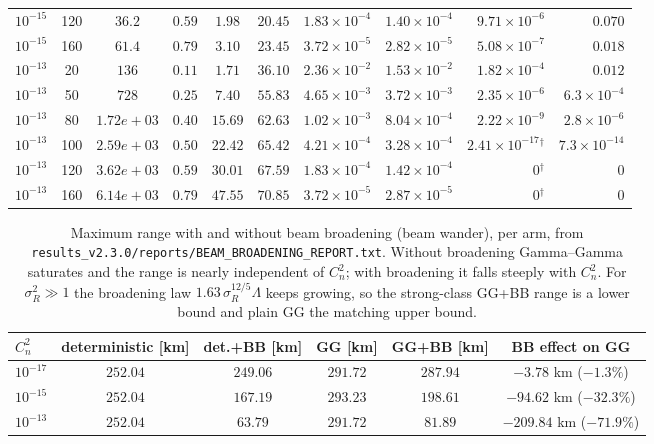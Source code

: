 \begin{table}[htbp]
\begin{tabular}{lcccccccrr}
$10^{-15}$ & 120 & $36.2$ & $0.59$ & $1.98$ & $20.45$ & $1.83\times10^{-4}$ & $1.40\times10^{-4}$ & $9.71\times10^{-6}$ & $0.070$ \\
$10^{-15}$ & 160 & $61.4$ & $0.79$ & $3.10$ & $23.45$ & $3.72\times10^{-5}$ & $2.82\times10^{-5}$ & $5.08\times10^{-7}$ & $0.018$ \\
\midrule
$10^{-13}$ & 20 & $136$ & $0.11$ & $1.71$ & $36.10$ & $2.36\times10^{-2}$ & $1.53\times10^{-2}$ & $1.82\times10^{-4}$ & $0.012$ \\
$10^{-13}$ & 50 & $728$ & $0.25$ & $7.40$ & $55.83$ & $4.65\times10^{-3}$ & $3.72\times10^{-3}$ & $2.35\times10^{-6}$ & $6.3\times10^{-4}$ \\
$10^{-13}$ & 80 & $1.72e+03$ & $0.40$ & $15.69$ & $62.63$ & $1.02\times10^{-3}$ & $8.04\times10^{-4}$ & $2.22\times10^{-9}$ & $2.8\times10^{-6}$ \\
$10^{-13}$ & 100 & $2.59e+03$ & $0.50$ & $22.42$ & $65.42$ & $4.21\times10^{-4}$ & $3.28\times10^{-4}$ & $2.41\times10^{-17}$$^{\dagger}$ & $7.3\times10^{-14}$ \\
$10^{-13}$ & 120 & $3.62e+03$ & $0.59$ & $30.01$ & $67.59$ & $1.83\times10^{-4}$ & $1.42\times10^{-4}$ & $0$$^{\dagger}$ & $0$ \\
$10^{-13}$ & 160 & $6.14e+03$ & $0.79$ & $47.55$ & $70.85$ & $3.72\times10^{-5}$ & $2.87\times10^{-5}$ & $0$$^{\dagger}$ & $0$ \\

\bottomrule
\end{tabular}
\end{table}

\begin{table}[htbp]
\centering\small
\caption{Maximum range with and without beam broadening (beam wander), per arm, from \texttt{results\_v2.3.0/reports/BEAM\_BROADENING\_REPORT.txt}. Without broadening Gamma--Gamma saturates and the range is nearly independent of $C_n^2$; with broadening it falls steeply with $C_n^2$. For $\sigma_R^2\gg1$ the broadening law $1.63\,\sigma_R^{12/5}\Lambda$ keeps growing, so the strong-class GG+BB range is a lower bound and plain GG the matching upper bound.}
\label{tab:bw-range}
\begin{tabular}{lccccc}
\toprule
$C_n^2$ & deterministic [km] & det.+BB [km] & GG [km] & GG+BB [km] & BB effect on GG \\
\midrule
$10^{-17}$ & $252.04$ & $249.06$ & $291.72$ & $287.94$ & $-3.78$ km ($-1.3\%$) \\
$10^{-15}$ & $252.04$ & $167.19$ & $293.23$ & $198.61$ & $-94.62$ km ($-32.3\%$) \\
$10^{-13}$ & $252.04$ & $63.79$ & $291.72$ & $81.89$ & $-209.84$ km ($-71.9\%$) \\
\bottomrule
\end{tabular}
\end{table}
